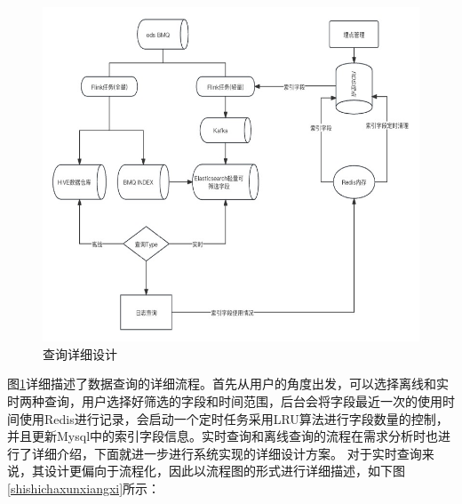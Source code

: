  \begin{figure}[htb]
  \centering
  \includegraphics[width=5in]{figure/chapter4/查询详细设计.jpg}
  \caption{查询详细设计}\label{chaxunxiangxi}
\end{figure}

图\ref{chaxunxiangxi}详细描述了数据查询的详细流程。首先从用户的角度出发，可以选择离线和实时两种查询，用户选择好筛选的字段和时间范围，后台会将字段最近一次的使用时间使用Redis进行记录，会启动一个定时任务采用LRU算法进行字段数量的控制，并且更新Mysql中的索引字段信息。实时查询和离线查询的流程在需求分析时也进行了详细介绍，下面就进一步进行系统实现的详细设计方案。
\clearpage
对于实时查询来说，其设计更偏向于流程化，因此以流程图的形式进行详细描述，如下图 \ref{shishichaxunxiangxi}所示：

